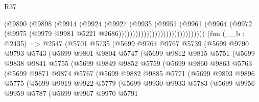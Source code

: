 \begin{lexlean}{R37}
\begin{coremodule}
                                          (@9890
                                            (@9898
                                              (@9914
                                                (@9924
                                                  (@9927
                                                    (@9935
                                                      (@9951
                                                        (@9961
                                                          (@9964
                                                            (@9972
                                                              (@9975
                                                                (@9979
                                                                  @9981
                                                                  @5221
                                                                  @2686)))))))))))))))))))))))))))))))
    (fun (__b : @2435) =>
    @2547
      (@5701
        @5735
        (@5699
          @9764
          @9767
          @5739
          (@5699
            @9790
            @9793
            @5743
            (@5699
              @9801
              @9804
              @5747
              (@5699
                @9812
                @9815
                @5751
                (@5699
                  @9838
                  @9841
                  @5755
                  (@5699
                    @9849
                    @9852
                    @5759
                    (@5699
                      @9860
                      @9863
                      @5763
                      (@5699
                        @9871
                        @9874
                        @5767
                        (@5699
                          @9882
                          @9885
                          @5771
                          (@5699
                            @9893
                            @9896
                            @5775
                            (@5699
                              @9919
                              @9922
                              @5779
                              (@5699
                                @9930
                                @9933
                                @5783
                                (@5699
                                  @9956
                                  @9959
                                  @5787
                                  (@5699
                                    @9967
                                    @9970
                                    @5791

\end{coremodule}
\end{lexlean}
